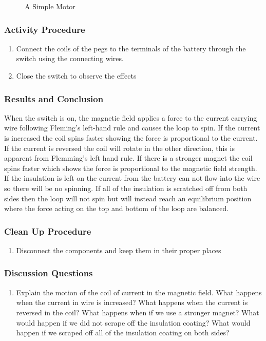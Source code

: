 \begin{figure}[h]
\begin{center}
\def\svgwidth{200pt}

\caption{A Simple Motor}
\label{fig:simple-motor}
\end{center}
\end{figure}

\subsubsection*{Activity Procedure}
\begin{enumerate}
\item{Connect the coils of the pegs to the terminals of the battery through the switch using the connecting wires.} 
\item{Close the switch to observe the effects}
\end{enumerate}

\subsubsection*{Results and Conclusion}
When the switch is on, the magnetic field applies a force to the current carrying wire following Fleming's left-hand rule and causes the loop to spin. If the current is increased the coil spins faster showing the force is proportional to the current. If the current is reversed the coil will rotate in the other direction, this is apparent from Flemming's left hand rule. If there is a stronger magnet the coil spins faster which shows the force is proportional to the magnetic field strength. If the insulation is left on the current from the battery can not flow into the wire so there will be no spinning. If all of the insulation is scratched off from both sides then the loop will not spin but will instead reach an equilibrium position where the force acting on the top and bottom of the loop are balanced.  

\subsubsection*{Clean Up Procedure}
\begin{enumerate}
\item{Disconnect the components and keep them in their proper places}
\end{enumerate}

\subsubsection*{Discussion Questions}
\begin{enumerate}
\item{Explain the motion of the coil of current in the magnetic field. What happens when the current in wire is increased? What happens when the current is reversed in the coil? What happens when if we use a stronger magnet? What would happen if we did not scrape off the insulation coating? What would happen if we scraped off all of the insulation coating on both sides?}
\end{enumerate}

